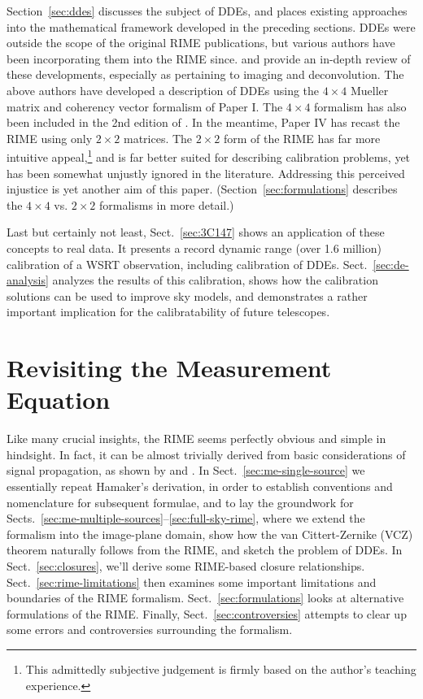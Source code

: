 \documentclass[]{aa}
\begin{document}
Section~\ref{sec:ddes} discusses the subject of DDEs, and places existing approaches into the mathematical framework developed in the preceding sections. DDEs were outside the scope of the original RIME publications, but various authors have been incorporating them into the RIME since. \citet{Rau:DDEs} and \citet{SB:calibration-low-freq} provide an in-depth review of these developments, especially as pertaining to imaging and deconvolution. The above authors have developed a description of DDEs using the $4\times4$ Mueller matrix and coherency vector formalism of Paper I. The $4\times4$ formalism has also been included in the 2nd edition of \citet*[Sect.~4.8]{tms}. In the meantime, Paper IV has recast the RIME using only $2\times2$ matrices. The $2\times2$ form of the RIME has far more intuitive appeal,\footnote{This admittedly subjective judgement is firmly based on the author's teaching experience.} and is far better suited for describing calibration problems, yet has been somewhat unjustly ignored in the literature. Addressing this perceived injustice is yet another aim of this paper. (Section~\ref{sec:formulations} describes the $4\times4$ vs. $2\times2$ formalisms in more detail.)

Last but certainly not least, Sect.~\ref{sec:3C147} shows an application of these concepts to real data. It presents a record dynamic range (over 1.6 million) calibration of a WSRT observation, including calibration of DDEs. Sect.~\ref{sec:de-analysis} analyzes the results of this calibration, shows how the calibration solutions can be used to improve sky models, and demonstrates a rather important implication for the calibratability of future telescopes.

\section{\label{sec:derivation}Revisiting the Measurement Equation}

Like many crucial insights, the RIME seems perfectly obvious and simple in hindsight. In fact, it can be almost trivially derived from basic considerations of signal propagation, as shown by \citet{ME1} and \citet{ME4}. In Sect.~\ref{sec:me-single-source} we essentially repeat Hamaker's derivation, in order to establish conventions and nomenclature for subsequent formulae, and to lay the groundwork for Sects.~\ref{sec:me-multiple-sources}--\ref{sec:full-sky-rime}, where we extend the formalism into the image-plane domain, show how the van Cittert-Zernike (VCZ) theorem naturally follows from the RIME, and sketch the problem of DDEs. In Sect.~\ref{sec:closures}, we'll derive some RIME-based closure relationships.
Sect.~\ref{sec:rime-limitations} then examines some important limitations and boundaries of the RIME formalism. Sect.~\ref{sec:formulations} looks at alternative formulations of the RIME. Finally, Sect.~\ref{sec:controversies} attempts to clear up some errors and controversies surrounding the formalism.
\end{document}
